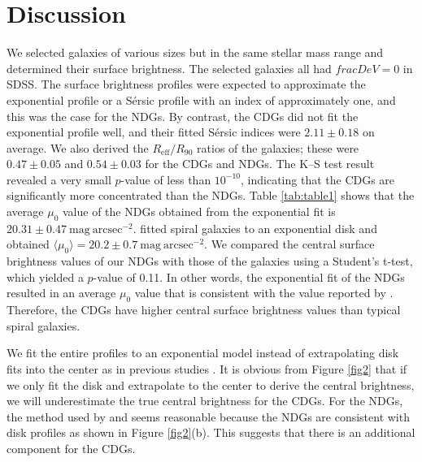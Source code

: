 \documentclass[fleqn,usenatbib]{mnras}
\begin{document}
\section{Discussion}

We selected galaxies of various sizes but in the same stellar mass range and determined their surface brightness.
The selected galaxies all had $fracDeV=0$ in SDSS.
The surface brightness profiles were expected to approximate the exponential profile or a S{\'e}rsic profile with an index of approximately one, and this was the case for the NDGs.
By contrast, the CDGs did not fit the exponential profile well, and their fitted S{\'e}rsic indices were $2.11\pm0.18$ on average.
We also derived the $R_\mathrm{eff}/R_\mathrm{90}$ ratios of the galaxies; these were $0.47\pm0.05$ and $0.54\pm0.03$ for the CDGs and NDGs.
The K--S test result revealed a very small $p$-value of less than $10^{-10}$, indicating that the CDGs are significantly more concentrated than the NDGs.
Table \ref{tab:table1} shows that the average $\mu_0$ value of the NDGs obtained from the exponential fit is $20.31\pm0.47~\mathrm{mag}~\mathrm{arcsec^{-2}}$.
\citet{2010ApJ...722L.120F} fitted spiral galaxies to an exponential disk and obtained $\langle \mu_0 \rangle =20.2\pm0.7~\mathrm{mag}~\mathrm{arcsec^{-2}}$.
We compared the central surface brightness values of our NDGs with those of the \citet{2010ApJ...722L.120F} galaxies using a Student's t-test, which yielded a $p$-value of 0.11.
In other words, the exponential fit of the NDGs resulted in an average $\mu_0$ value that is consistent with the value reported by \citet{2010ApJ...722L.120F}.
Therefore, the CDGs have higher central surface brightness values than typical spiral galaxies.

We fit the entire profiles to an exponential model instead of extrapolating disk fits into the center as in previous studies \citep{1970ApJ...160..811F,2010ApJ...722L.120F}.
It is obvious from Figure \ref{fig2} that if we only fit the disk and extrapolate to the center to derive the central brightness, we will underestimate the true central brightness for the CDGs.
For the NDGs, the method used by \citet{1970ApJ...160..811F} and \citet{2010ApJ...722L.120F} seems reasonable because the NDGs are consistent with disk profiles as shown in Figure \ref{fig2}(b).
This suggests that there is an additional component for the CDGs.
\end{document}
